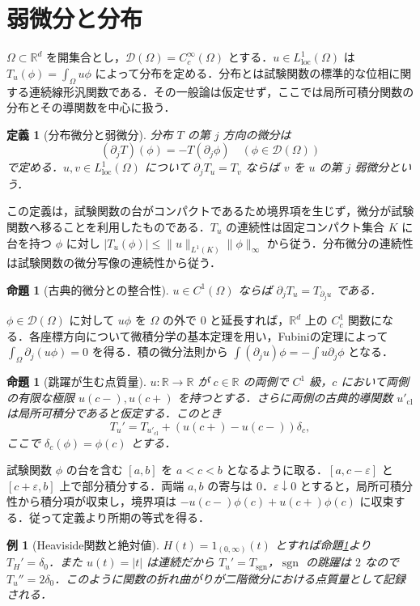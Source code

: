 \documentclass[a5paper,10pt,onecolumn]{jsarticle}
\makeatletter
\theoremstyle{mathnotetheorem}
\newtheorem{definition}[theorem]{定義}
\newtheorem{proposition}[theorem]{命題}
\newtheorem{example}[theorem]{例}
\renewcommand{\proofname}{証明}
\renewenvironment{proof}[1][\proofname]{%
  \par\pushQED{\qed}\normalfont\topsep4\p@\@plus2\p@\relax
  \trivlist\item[\hskip\labelsep\bfseries #1]\ignorespaces
}{\popQED\endtrivlist\@endpefalse}
\newcommand{\R}{\mathbb{R}}
\newcommand{\norm}[1]{\lVert #1\rVert}
\makeatother
\begin{document}
\section{弱微分と分布}
$\Omega\subset\R^d$ を開集合とし，$\mathcal D(\Omega)=C_c^\infty(\Omega)$ とする．$u\in L^1_{\mathrm{loc}}(\Omega)$ は $T_u(\phi)=\int_\Omega u\phi$ によって分布を定める．分布とは試験関数の標準的な位相に関する連続線形汎関数である．その一般論は仮定せず，ここでは局所可積分関数の分布とその導関数を中心に扱う．
\begin{definition}[分布微分と弱微分]
分布 $T$ の第 $j$ 方向の微分は
\[
 (\partial_jT)(\phi)=-T(\partial_j\phi)
 \quad(\phi\in\mathcal D(\Omega))
\]
で定める．$u,v\in L^1_{\mathrm{loc}}(\Omega)$ について $\partial_jT_u=T_v$ ならば $v$ を $u$ の第 $j$ 弱微分という．
\end{definition}
この定義は，試験関数の台がコンパクトであるため境界項を生じず，微分が試験関数へ移ることを利用したものである．$T_u$ の連続性は固定コンパクト集合 $K$ に台を持つ $\phi$ に対し $|T_u(\phi)|\le\norm u_{L^1(K)}\norm\phi_\infty$ から従う．分布微分の連続性は試験関数の微分写像の連続性から従う．
\begin{proposition}[古典的微分との整合性]
$u\in C^1(\Omega)$ ならば $\partial_jT_u=T_{\partial_j u}$ である．
\end{proposition}
\begin{proof}
$\phi\in\mathcal D(\Omega)$ に対して $u\phi$ を $\Omega$ の外で $0$ と延長すれば，$\R^d$ 上の $C_c^1$ 関数になる．各座標方向について微積分学の基本定理を用い，Fubiniの定理によって $\int_\Omega\partial_j(u\phi)=0$ を得る．積の微分法則から $\int(\partial_j u)\phi=-\int u\partial_j\phi$ となる．
\end{proof}
\begin{proposition}[跳躍が生む点質量]\label{prop:jump}
$u:\R\to\R$ が $c\in\R$ の両側で $C^1$ 級，$c$ において両側の有限な極限 $u(c-),u(c+)$ を持つとする．さらに両側の古典的導関数 $u'_{\mathrm{cl}}$ は局所可積分であると仮定する．このとき
\[
 T_u'=T_{u'_{\mathrm{cl}}}+(u(c+)-u(c-))\delta_c,
\]
ここで $\delta_c(\phi)=\phi(c)$ とする．
\end{proposition}
\begin{proof}
試験関数 $\phi$ の台を含む $[a,b]$ を $a<c<b$ となるように取る．$[a,c-\varepsilon]$ と $[c+\varepsilon,b]$ 上で部分積分する．両端 $a,b$ の寄与は $0$．$\varepsilon\downarrow0$ とすると，局所可積分性から積分項が収束し，境界項は
$-u(c-)\phi(c)+u(c+)\phi(c)$ に収束する．従って定義より所期の等式を得る．
\end{proof}
\begin{example}[Heaviside関数と絶対値]
$H(t)=1_{(0,\infty)}(t)$ とすれば命題\ref{prop:jump}より $T_H'=\delta_0$．また $u(t)=|t|$ は連続だから $T_u'=T_{\operatorname{sgn}}$，$\operatorname{sgn}$ の跳躍は $2$ なので $T_u''=2\delta_0$．このように関数の折れ曲がりが二階微分における点質量として記録される．
\end{example}
\end{document}
